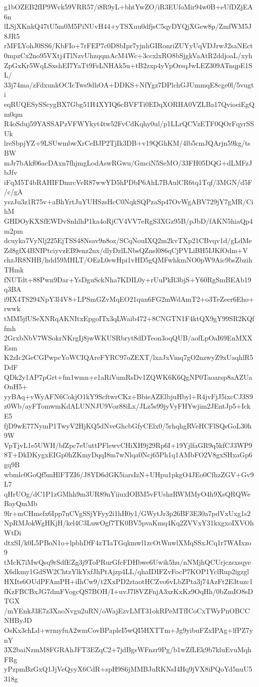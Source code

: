 g1bOZEB2fIP9Wvk59VRR57/i8R9yL+bhtYwZO/iR3EUfoMir94w0B+eUfDZjEA6n
lLSjXKnkQ47tU5m0M5PiNUvH44+yTSXuu0dfjsC5qyDYQjXGew8p/ZmfWM5J8JR5
rMFLYohJ0SS6/KbFIo+7rFEP7c0D8bIpr7yjnhGIRonriZUYyUqVDJrwJ2saNEct
0mpzCx2no95VXtj4TlNzvUhzqqmAcM4Wc+3ccxlxRO8bSjgkVaAtR2ddjoaL/xyh
ZpGxKr5WqLSxshEI7YaTt9FsLNHAk5u+tB2zxp4yVpOrsqJwLEZ309ATnqpE1SL/
33j74ma/zFdxunkOCIcTws9dhOA+DDKS+NfYgz7DPlchGJUmmqE8cge0l/5vugti
eqRUQESySScygBX7Gbg51H4XYIQ6cBVFTi0EDqXORHA0VZLBa17QvioeiEgQm0qm
R4oSduj59YASSAPzVFWYkyt4tw52FvCdKqhy0ul/p1LLrQCVzETF0QOrFqyrSSUk
lreSbpjYZ+9LSUwmbwXrCeBJP2TjIk3DB+v19QGhKM/4lb5cmJQArjn59kg/tsBW
mJr7bAkf06acDAxn7fhjmgLodAswRGwu/GmciN5SeMO/33FH05DQG+dLMFzJbJfv
iFqM5T4bRAHIFDmrcVeR87wwYD5hPDbP6AhL7BAulCR6tq1Tqf/3MGN/d5F/c/gA
yszJu3z1R75v+aBhYrtJuYUHSzsHcC0NqkSQPzaSp47OvWgABV729jY7gMR/CihM
GHDOyKXSfEWDvSnhlhP1ka4oRjCV4VV7eRgS3XGz95B/pJbD/fAKN5hiaQp4m2pm
dcuyka7VyNlj225EjTSS48Nsav9n8oz/SCqNouIXQ2m2kvTXp21CBvqv1d/gLdMe
Zd8gfX4BNIPtciyvzEB9enz2nx/dlyDzlLNbsQZnsl086qCjPVLiBH5IJKfOdm+V
chzJR8NHB/hdd59MHLT/OEzL0ewHpi1vHD5gQMFwhkmNO0pW9Aic9bsZbzihTHmk
fNUTdt+88Pwn9Dar+YsDguSckNha7KDIL0y+rUuPkR3bjS+Y60RgSmBEAb19q3BA
i9IX4TS294NpY3l4V8+LPSmGZvMqEO21qun6FG2mWdAmT2+o3TeZeer6Eho+rwwk
tMM5jfUSeXNRqAKNItxEpgoITx3qLWaib472+8CNGTN1F4ktQX9gY99SR2KQffmh
2GrxbNbV7WSokrNKrgIj8jwWKUSRbryt8dDTeon3oqQUB/aofLpOaI69EnMXXEsm
K2zIc2GeCGPwpcYoWCIQAreFYRC97oZEXT/lxaJxVmq7gO2nzwyZ9xUaqhlR5DdF
QDk2y1AP7pGrt+fm1wmn+e1aRiVumRsDv1ZQWK6K6QgNP0Taoarsp8aAZUaOnH5+
yyBAq+vWyAFN6CokjO1kY9ScftwrCKz+BbieAZElbjuHbyl+R4jvFjJ5ixcCJ3S9
z0Wb/ayFTomwmKdALUNNJU9Voz88iLx/JLz5s99jyVyFHYwjim2JEntJp5+IckE5
fjD9wE77NymP1TwyV2HjKQ5dNveGhcbGfyCElx0/5rhqhgRVeHCFlSQsGoL30h9W
VpTjvL1e5UWH/bfZpc7eUuttPFlewvCHiXH9j29Rp6I+19YjlfaGR9q5kfCJ3WP9
8T+DkDKygxEIGp0hZKmyDqqI8m7wNlqa0Ncj65Ph1q1AMbFO2V8gxSHxaGp6gq9B
wbmlc0GoQf5mHlFTZI6/J8YD6dGK5iarsIzN+UHpu1pkgO4JEo0CfhzZGV+Gv9L7
qHrUOg/dC1P1zGMhh9m3UR89nYiiuxIOBM5vFUshzRWMMyO4h9XsQRQWeBayQmMb
9lr+mCHmefx6Ipp7nCVgSSjYFyy2i1hH0y1/GWytJr3p26BF3E30a7pdVxUxg1s2
NpRMJokWgHKjH/kel4C3LuwOgf7TK0BV5pvaKmq4Kq2ZVVxY31kxgxoIXVOhWtDi
dtxSI/k0L5PBoN1o+lpbhDfF4zTIaTGqkmwl1zcOtWnwlXMqSSxJCq1r7WAIxzo9
tMcK7iMwQsq9rSdfEZg3j9ToPRurGfcFDHbwe6Uwik5hu/nNMjhQCUrjczsxsqye
X6dkmy1GdSW2ChtzYlkYxfJhPtAjzp4LL/qhaIDIFZvFocP7KOP1YclRup2igzgl
HXIts6OUdPFAmPH+iIhCw9/t2XxPD2ztaotHCZvo6vLbZPta3j74AzFt2E3tuzc1
fKzFBCBxJG7dmFVogcQS7BOH/I+uvJ7l8VZFnjA3xrKxKz9OqHh/0bZmIO8sDTGX
/mYEnkJ3E7z3XaoNvgu2uRN/oWajEzvLMT31okRPeMTfICoCxTWyPnOBCCNHByJD
OsKx3chLd+wrmyfuA2wmCovBPapleI5wQI5HXTTm+Jg9yibuFZxIPAg+lfPZ7ynY
3X2baiNzmM8FGRAhJFT3EZqC2+7jdBgsWFnzr9Pg/b1wZfLEk9b7kluEvuMqhFRg
yPzpmBzGxQ1JjVeQyyX6CdR+spH9S6jMMBJuRKNsI4Hq9jVX8iPQoYd5nuU5318g
